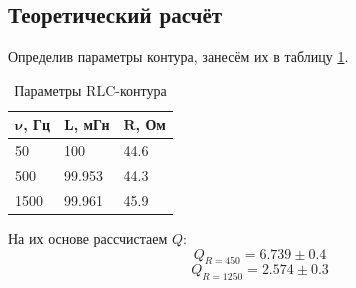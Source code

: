 \documentclass{lab}
\begin{document}
\subsection{Теоретический расчёт}

Определив параметры контура, занесём их в таблицу \ref{2}.

\begin{table}[h!]
    \centering
    \begin{tabular}{|l|l|l|}
        \hline
        $\mathbf{\nu}${\bf,  Гц} & $\mathbf{L}${\bf, мГн} & $\mathbf{R}${\bf, Ом} \\ \hline
        50                       & 100                    & 44.6                \\ \hline
        500                      & 99.953                 & 44.3                \\ \hline
        1500                     & 99.961                 & 45.9                \\ \hline
    \end{tabular}
    \caption{Параметры RLC-контура}
    \label{2}
\end{table}

На их основе рассчистаем $Q$:
\begin{equation}
    Q_{R=450} = 6.739 \pm 0.4
\end{equation}
\begin{equation}
    Q_{R=1250}= 2.574 \pm 0.3
\end{equation}
\end{document}
